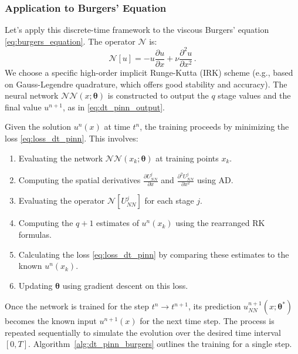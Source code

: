 \subsubsection{Application to Burgers' Equation}

Let's apply this discrete-time framework to the viscous Burgers' equation \eqref{eq:burgers_equation}. The operator $\mathcal{N}$ is:
%
\begin{equation*}
    \mathcal{N}[u] = -u\frac{\partial u}{\partial x} + \nu\frac{\partial^2 u}{\partial x^2}\,.
\end{equation*}
%
We choose a specific high-order implicit Runge-Kutta (IRK) scheme (e.g., based on Gauss-Legendre quadrature, which offers good stability and accuracy). The neural network $\mathcal{NN}(x; \boldsymbol{\theta})$ is constructed to output the $q$ stage values and the final value $u^{n+1}$, as in \cref{eq:dt_pinn_output}.

Given the solution $u^n(x)$ at time $t^n$, the training proceeds by minimizing the loss \eqref{eq:loss_dt_pinn}. This involves:
\begin{enumerate}
    \item Evaluating the network $\mathcal{NN}(x_k; \boldsymbol{\theta})$ at training points $x_k$.
    \item Computing the spatial derivatives $\frac{\partial U^j_{NN}}{\partial x}$ and $\frac{\partial^2 U^j_{NN}}{\partial x^2}$ using AD.
    \item Evaluating the operator $\mathcal{N}[U^j_{NN}]$ for each stage $j$.
    \item Computing the $q+1$ estimates of $u^n(x_k)$ using the rearranged RK formulas.
    \item Calculating the loss \eqref{eq:loss_dt_pinn} by comparing these estimates to the known $u^n(x_k)$.
    \item Updating $\boldsymbol{\theta}$ using gradient descent on this loss.
\end{enumerate}
Once the network is trained for the step $t^n \to t^{n+1}$, its prediction $u^{n+1}_{NN}(x; \boldsymbol{\theta}^*)$ becomes the known input $u^{n+1}(x)$ for the next time step. The process is repeated sequentially to simulate the evolution over the desired time interval $[0, T]$. Algorithm~\ref{alg:dt_pinn_burgers} outlines the training for a single step.

